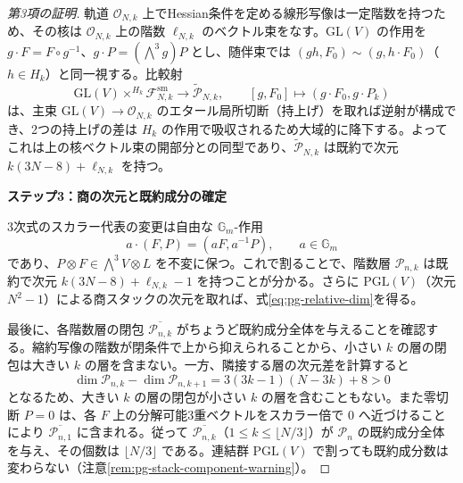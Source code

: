 \begin{proof}[第3項の証明]
軌道 $\mathcal O_{N,k}$ 上でHessian条件を定める線形写像は一定階数を持つため、その核は $\mathcal O_{N,k}$ 上の階数 $\ell_{N,k}$ のベクトル束をなす。$\mathrm{GL}(V)$ の作用を $g\cdot F=F\circ g^{-1}$、$g\cdot P=(\bigwedge^3g)P$ とし、随伴束では $(gh,F_0)\sim(g,h\cdot F_0)$（$h\in H_k$）と同一視する。比較射
\begin{equation}
\mathrm{GL}(V)\times^{H_k}\mathcal F_{N,k}^{\mathrm{sm}}
\longrightarrow\widetilde{\mathscr P}_{N,k},\qquad
[g,F_0]\longmapsto(g\cdot F_0,g\cdot P_k)
\end{equation}
は、主束 $\mathrm{GL}(V)\to\mathcal O_{N,k}$ のエタール局所切断（持上げ）を取れば逆射が構成でき、2つの持上げの差は $H_k$ の作用で吸収されるため大域的に降下する。よってこれは上の核ベクトル束の開部分との同型であり、$\widetilde{\mathscr P}_{N,k}$ は既約で次元 $k(3N-8)+\ell_{N,k}$ を持つ。

\par\medskip\noindent\textbf{ステップ3：商の次元と既約成分の確定}\par\nobreak\smallskip
3次式のスカラー代表の変更は自由な $\mathbb G_m$-作用
\begin{equation}
a\cdot(F,P)=(aF,a^{-1}P),\qquad a\in\mathbb G_m
\end{equation}
であり、$P\otimes F\in\bigwedge^3V\otimes L$ を不変に保つ。これで割ることで、階数層 $\mathscr P_{n,k}$ は既約で次元 $k(3N-8)+\ell_{N,k}-1$ を持つことが分かる。さらに $\mathrm{PGL}(V)$（次元 $N^2-1$）による商スタックの次元を取れば、式\eqref{eq:pg-relative-dim}を得る。

最後に、各階数層の閉包 $\overline{\mathscr P_{n,k}}$ がちょうど既約成分全体を与えることを確認する。縮約写像の階数が閉条件で上から抑えられることから、小さい $k$ の層の閉包は大きい $k$ の層を含まない。一方、隣接する層の次元差を計算すると
\begin{equation}
\dim\mathscr P_{n,k}-\dim\mathscr P_{n,k+1}
=3(3k-1)(N-3k)+8>0
\end{equation}
となるため、大きい $k$ の層の閉包が小さい $k$ の層を含むこともない。また零切断 $P=0$ は、各 $F$ 上の分解可能3重ベクトルをスカラー倍で $0$ へ近づけることにより $\overline{\mathscr P_{n,1}}$ に含まれる。従って $\overline{\mathscr P_{n,k}}$（$1\le k\le\lfloor N/3\rfloor$）が $\mathscr P_n$ の既約成分全体を与え、その個数は $\lfloor N/3\rfloor$ である。連結群 $\mathrm{PGL}(V)$ で割っても既約成分数は変わらない（注意\ref{rem:pg-stack-component-warning}）。
\end{proof}

